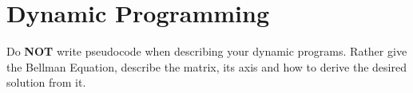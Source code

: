 \documentclass[solutionorbox,answers]{exam}
\begin{document}
\begin{center}
\end{center}
\vspace{0.1in}
 \qquad
{}

\section*{Dynamic Programming}

Do \textbf{NOT} write pseudocode when describing your dynamic programs. Rather give the Bellman Equation, describe the matrix, its axis and how to derive the desired solution from it.
\end{document}
